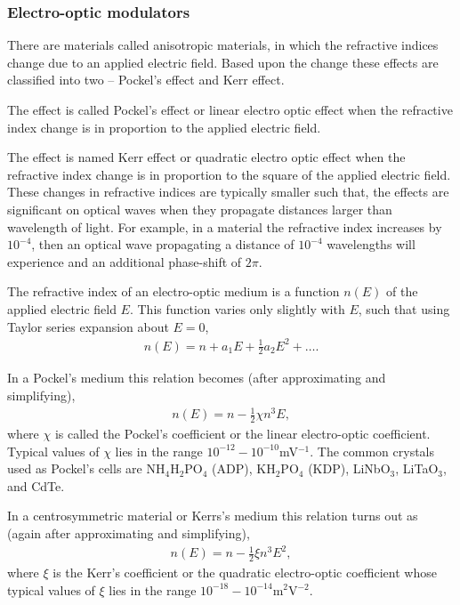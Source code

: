 \subsubsection{Electro-optic modulators} 

There are materials called anisotropic materials, in which the refractive indices change due to an applied electric field. Based upon the change these effects are classified into two -- Pockel's effect and Kerr effect.

The effect is called Pockel's effect or linear electro optic effect when the refractive index change is in proportion to the applied electric field.

The effect is named Kerr effect or quadratic electro optic effect when the refractive index change is in proportion to the square of the applied electric field. These changes in refractive indices are typically smaller such that, the effects are significant on optical waves when they propagate distances larger than wavelength of light. For example, in a material the refractive index increases by $10^{-4}$, then an optical wave propagating a distance of $10^{-4}$ wavelengths will experience and an additional phase-shift of $2\pi$. 

The refractive index of an electro-optic medium is a function $n(E)$ of the applied electric field $E$. This function varies only slightly with $E$, such that using Taylor series expansion about \mbox{$E=0$},
\begin{align}
n(E) = n+a_1E + \frac{1}{2}a_2E^2+\dots.
\end{align}

In a Pockel's medium this relation becomes (after approximating and simplifying),
\begin{align}
n(E) = n-\frac{1}{2}\chi n^3 E,
\end{align}
where $\chi$ is called the Pockel's coefficient or the linear electro-optic coefficient. Typical values of $\chi$ lies in the range $10^{-12}-10^{-10}$mV$^{-1}$. The common crystals used as Pockel's cells are NH$_4$H$_2$PO$_4$ (ADP), KH$_2$PO$_4$ (KDP), LiNbO$_3$, LiTaO$_3$, and CdTe.

In a centrosymmetric material or Kerrs's medium this relation turns out as (again after approximating and simplifying),
\begin{align}
n(E) = n-\frac{1}{2}\xi n^3 E^2,
\end{align}
where $\xi$ is the Kerr's coefficient or the quadratic electro-optic coefficient whose typical values of $\xi$ lies in the range $10^{-18}-10^{-14}$m$^2$V$^{-2}$.

